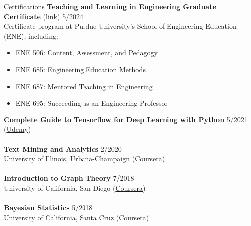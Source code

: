 \documentclass{CV} %
\begin{document}
\begin{rSection}{Certifications}
    \textbf{Teaching and Learning in Engineering Graduate Certificate} (\href{https://purdue0-my.sharepoint.com/:b:/g/personal/verma99_purdue_edu/EY7lo1YdLOFEnBbedq90_qEBLm0nii0_BiGqeYXSDvW0XA?e=8JzIAy}{link}) \hfill{5/2024}
    \\ Certificate program at Purdue University's School of Engineering Education (ENE), including:
    \begin{itemize}
        \item ENE 506: Content, Assessment, and Pedagogy
        \item ENE 685: Engineering Education Methods
        \item ENE 687: Mentored Teaching in Engineering
        \item ENE 695: Succeeding as an Engineering Professor
    \end{itemize}
    \textbf{Complete Guide to Tensorflow for Deep Learning with Python} \hfill 5/2021
    \\ (\href{https://www.udemy.com/certificate/UC-caa1f4ed-6be6-4b50-9bd1-1b57ab7c196a}{Udemy}) \\
    \\ \textbf{Text Mining and Analytics} \hfill 2/2020
    \\ University of Illinois, Urbana-Champaign (\href{https://coursera.org/share/7eac25e880771bf576b661324a4d79be}{Coursera}) \\
    \\ \textbf{Introduction to Graph Theory} \hfill 7/2018
    \\ University of California, San Diego (\href{https://coursera.org/share/97583460aa0510f570f971844f19d16b}{Coursera}) \\
    \\ \textbf{Bayesian Statistics} \hfill 5/2018
    \\ University of California, Santa Cruz (\href{https://coursera.org/share/8d0b0387400c53f13a7ce2b2b81153fc}{Coursera}) 
\end{rSection}
\end{document}
